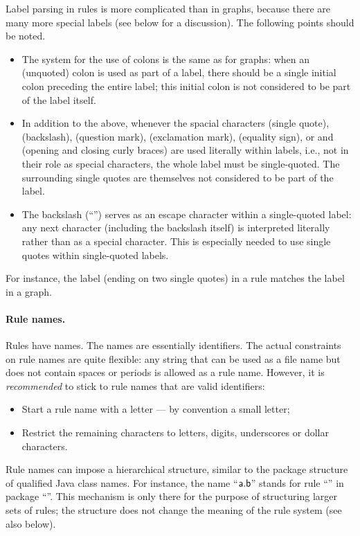 Label parsing in rules is more complicated than in graphs, because there are
many more special labels (see below for a discussion). The following points
should be noted.
%
\begin{itemize}\noitemsep
\item The system for the use of colons is the same as for graphs: when an
  (unquoted) colon is used as part of a label, there should be a single initial
  colon preceding the entire label; this initial colon is not considered to be
  part of the label itself.

\item In addition to the above, whenever the spacial characters 
  (single quote), \lab{\textbackslash} (backslash),  (question
  mark), \lab{!}  (exclamation mark), \lab{=} (equality sign), or
  \lab{\{} and \lab{\}} (opening and closing curly braces) are used
  literally within labels, i.e., not in their role as special characters, the
  whole label must be single-quoted. The surrounding single quotes are
  themselves not considered to be part of the label.

\item The backslash (``\lab{\textbackslash}'') serves as an escape character
  within a single-quoted label: any next character (including the backslash
  itself) is interpreted literally rather than as a special character. This is
  especially needed to use single quotes within single-quoted labels.
\end{itemize}
%
For instance, the label 
(ending on two single quotes) in a rule matches the label
 in a graph.

\paragraph{Rule names.}

Rules have names. The names are essentially identifiers. The actual constraints
on rule names are quite flexible: any string that can be used as a file name
but does not contain spaces or periods is allowed as a rule name. However, it
is \emph{recommended} to stick to rule names that are valid identifiers:
%
\begin{itemize}\noitemsep
\item Start a rule name with a letter --- by convention a small letter;
\item Restrict the remaining characters to letters, digits, underscores or
  dollar characters.
\end{itemize}
%
Rule names can impose a hierarchical structure, similar to the package
structure of qualified Java class names. For instance, the name
``$\textsf{a.b}$'' stands for rule ``'' in package
``''. This mechanism is only there for the purpose of structuring
larger sets of rules; the structure does not change the meaning of the rule
system (see also  below).

